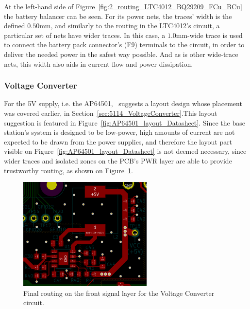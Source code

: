 At the left-hand side of Figure~\ref{fig:2_routing_LTC4012_BQ29209_FCu_BCu} the battery balancer can be seen. For its power nets, the traces' width is the defined $0.50$mm, and similarly to the routing in the LTC4012's circuit, a particular set of nets have wider traces. In this case, a $1.0$mm-wide trace is used to connect the battery pack connector's (F9) terminals to the circuit, in order to deliver the needed power in the safest way possible. And as is other wide-trace nets, this width also aids in current flow and power dissipation.


\subsubsection{Voltage Converter}\label{sec:524_VoltageConverter}

For the 5V supply, i.e. the AP64501,~\cite{AP64501} suggests a layout design whose placement was covered earlier, in Section~\ref{sec:5114_VoltageConverter}.This layout suggestion is featured in Figure~\ref{fig:AP64501_layout_Datasheet}.
Since the base station's system is designed to be low-power, high amounts of current are not expected to be drawn from the power supplies, and therefore the layout part visible on Figure~\ref{fig:AP64501_layout_Datasheet} is not deemed necessary, since wider traces and isolated zones on the PCB's PWR layer are able to provide trustworthy routing, as shown on Figure~\ref{fig:3_routing_Voltage_Converter_FCu}.

\begin{figure}[h]
	\centering
	\includegraphics[width=0.6\textwidth]{Chapters/Figures/chapter5/3_routing_Voltage_Converter_FCu.png}
	\caption{Final routing on the front signal layer for the Voltage Converter circuit.}
	\label{fig:3_routing_Voltage_Converter_FCu}
\end{figure}

